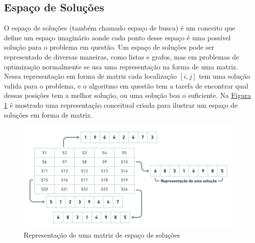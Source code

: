 \subsection{Espaço de Soluções}
O espaço de soluções (também chamado espaço de busca) é um conceito que define um espaço imaginário aonde cada ponto desse espaço é uma possível solução para o problema em questão. 
Um espaço de soluções pode ser representado de diversas maneiras, como listas e grafos, mas em problemas de optimização normalmente se usa uma representação na forma de uma matriz.\\
\indent Nessa representação em forma de matriz cada localização $[i, j]$ tem uma solução valida para o problema, e o algoritmo em questão tem a tarefa de encontrar qual dessas posições tem a melhor solução, ou uma solução boa o suficiente. Na 
\hyperref[fig:solution-space]{Figura \ref{fig:solution-space}} 
é mostrado uma representação conceitual criada para ilustrar um espaço de soluções em forma de matriz.\hfill
            
\begin{figure}[ht]
    \centering
    \caption{Representação de uma matriz de espaço de soluções}
    \label{fig:solution-space}
    \includegraphics[width=\textwidth]{assets/solution.png}
\end{figure}

